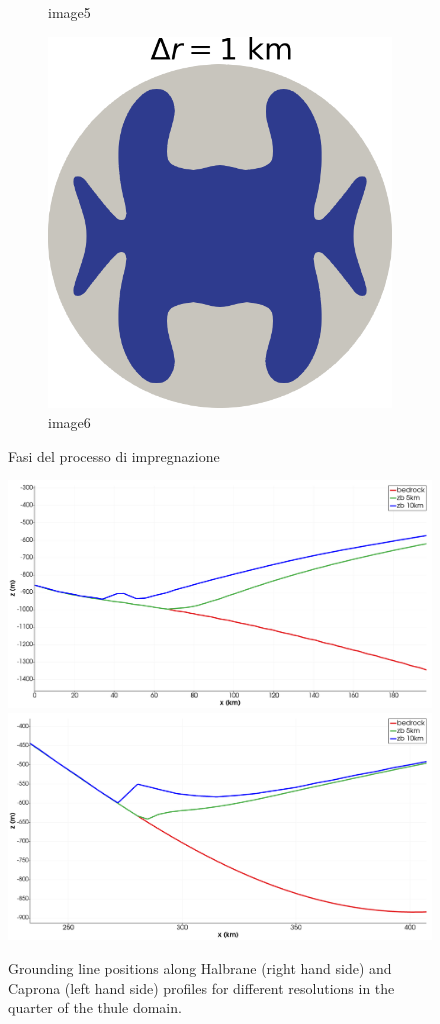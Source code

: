 \documentclass{article}
\begin{document}
\begin{figure}[!h]
\begin{subfigure}{0.25\textwidth}
		\caption{image5}
		\label{fig:5}
	\end{subfigure}\hfil %
	\begin{subfigure}{0.25\textwidth}
		\includegraphics[width=\linewidth]{../fig/Grounded_zone_1km.png}
		\caption{image6}
		\label{fig:6}
	\end{subfigure}
	\caption{Fasi del processo di impregnazione}
	\label{fig:images}
\end{figure}


\begin{figure}[!h]
	\centering
	\includegraphics[width=0.45\linewidth]{../fig/zb_10km_5km_CapronaB_Thule.png}
	\includegraphics[width=0.45\linewidth]{../fig/zb_10km_5km_HalbraneB_Thule.png}
	\caption{Grounding line positions along Halbrane (right hand side) and Caprona (left hand side) profiles for different resolutions in the quarter of the thule domain.}
	\label{Grounding_lines_Thule_Profiles}
\end{figure}
\end{document}
